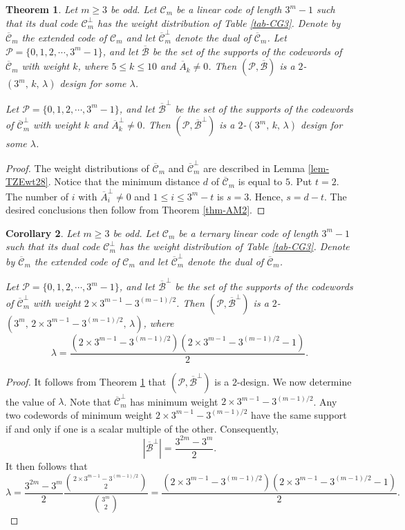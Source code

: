 \documentclass[1p,final]{elsarticle}
\newtheorem{theorem}{Theorem}
\newtheorem{corollary}[theorem]{Corollary}
\newcommand{\cP}{{\mathcal{P}}}
\newcommand{\cB}{{\mathcal{B}}}
\newcommand{\C}{{\mathcal{C}}}
\begin{document}
\begin{theorem}\label{thm-newdesigns228}
Let $m \geq 3$ be odd. 
Let $\C_m$ be a linear code of length $3^m-1$ such that its dual code
$\C_m^\perp$ has the weight distribution of Table \ref{tab-CG3}. Denote by $\overline{\C}_m$ the 
extended code of $\C_m$ and let $\overline{\C}_m^\perp$ denote the dual of $\overline{\C}_m$.
Let $\cP=\{0,1,2, \cdots, 3^m-1\}$, and let $\overline{\cB}$ be  the set of the supports of the codewords of $\overline{\C}_m$
with weight $k$, where $5 \leq k \leq 10$ and $\overline{A}_k \neq 0$. Then $(\cP, \overline{\cB})$
is a $2$-$(3^m,\, k,\, \lambda)$ design for some $\lambda$. 

Let $\cP=\{0,1,2, \cdots, 3^m-1\}$, and let $\overline{\cB}^\perp$ be  the set of the supports of the codewords of
$\overline{\C}_m^\perp$
with weight $k$ and $\overline{A}_k^\perp \neq 0$. Then $(\cP, \overline{\cB}^\perp)$
is a $2$-$(3^m, \, k, \, \lambda)$ design for some $\lambda$. 
\end{theorem}

\begin{proof}
The weight distributions of $\overline{\C}_m$ and $\overline{\C}_m^\perp$ are described in 
Lemma \ref{lem-TZEwt28}. 
Notice that the minimum distance $d$ of $\overline{\C}_m$ is equal to $5$. Put $t=2$. The number
of $i$ with $\overline{A}_i^\perp \neq 0$ and $1 \leq i \leq 3^m -t$ is $s=3$. Hence, $s=d-t$.
The desired conclusions then follow from Theorem \ref{thm-AM2}. 
\end{proof} 


\begin{corollary} 
Let $m \geq 3$ be odd. 
Let $\C_m$ be a ternary linear code of length $3^m-1$ such that its dual code
$\C_m^\perp$ has the weight distribution of Table \ref{tab-CG3}. Denote by $\overline{\C}_m$ 
the extended code of $\C_m$ and let $\overline{\C}_m^\perp$ denote the dual of $\overline{\C}_m$.

Let $\cP=\{0,1,2, \cdots, 3^m-1\}$, and let $\overline{\cB}^\perp$ be  the set of the supports of the codewords of
$\overline{\C}_m^\perp$
with weight $2\times 3^{m-1}-3^{(m-1)/2}$. Then $(\cP, \overline{\cB}^\perp)$
is a $2$-$(3^m, \, 2\times 3^{m-1}-3^{(m-1)/2}, \, \lambda)$, where 
$$ 
\lambda=\frac{(2\times 3^{m-1}- 3^{(m-1)/2})(2\times 3^{m-1}- 3^{(m-1)/2} -1)}{2}. 
$$ 
\end{corollary}

\begin{proof}
It follows from Theorem \ref{thm-newdesigns228} that $(\cP, \overline{\cB}^\perp)$ is a $2$-design. 
We now determine the value of $\lambda$. Note that $\overline{\C}_m^\perp$ has minimum weight 
$2\times 3^{m-1}-3^{(m-1)/2}$. Any two codewords of minimum weight $2\times 3^{m-1}-3^{(m-1)/2}$ 
have the same support if and only if one is a scalar multiple of the other. Consequently, 
$$ 
\left|\overline{\cB}^\perp \right|=\frac{3^{2m}-3^m}{2}. 
$$
It then follows that 
$$ 
\lambda=\frac{3^{2m}-3^m}{2}\frac{\binom{2\times 3^{m-1}-3^{(m-1)/2}}{2}}{\binom{3^m}{2}}
= \frac{(2\times 3^{m-1}- 3^{(m-1)/2})(2\times 3^{m-1}- 3^{(m-1)/2} -1)}{2}.
$$
\end{proof}
\end{document}
